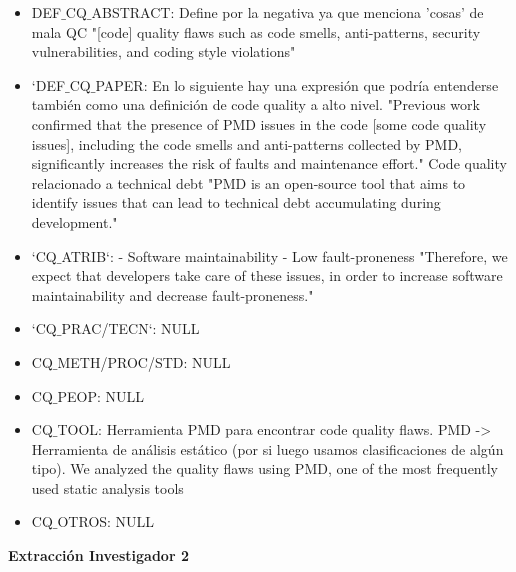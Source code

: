 \documentclass[conference]{IEEEtran}
\begin{document}
\begin{itemize}
\item DEF$\_$CQ$\_$ABSTRACT: Define por la negativa ya que menciona 'cosas' de mala QC
"[code] quality flaws such as code smells, anti-patterns, security
vulnerabilities, and coding style violations"
\item `DEF$\_$CQ$\_$PAPER: En lo siguiente hay una expresión que podría entenderse también como una definición de code quality a alto nivel.
"Previous work confirmed that the presence of PMD issues in the code [some code quality issues], including the code smells and anti-patterns collected
by PMD, significantly increases the risk of faults and maintenance effort." Code quality relacionado a technical debt
"PMD is an open-source tool that aims to identify issues that can lead to technical debt accumulating during development."
\item `CQ$\_$ATRIB`: 
- Software maintainability
- Low fault-proneness
"Therefore, we expect that developers take care of these issues, in order to increase software maintainability and decrease fault-proneness."
\item `CQ$\_$PRAC/TECN`: NULL
\item CQ$\_$METH/PROC/STD: NULL
\item CQ$\_$PEOP: NULL
\item CQ$\_$TOOL:  Herramienta PMD para encontrar code quality flaws. PMD -> Herramienta de análisis estático (por si luego usamos clasificaciones de algún tipo). We analyzed the quality flaws using PMD, one of the most frequently used static analysis tools
\item CQ$\_$OTROS: NULL

\end{itemize}

\textbf{Extracción Investigador 2}

\end{document}
